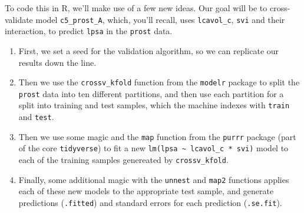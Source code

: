 \documentclass[]{book}
\newenvironment{Shaded}{\begin{snugshade}}{\end{snugshade}}
\newcommand{\KeywordTok}[1]{\textcolor[rgb]{0.13,0.29,0.53}{\textbf{#1}}}
\newcommand{\DataTypeTok}[1]{\textcolor[rgb]{0.13,0.29,0.53}{#1}}
\newcommand{\DecValTok}[1]{\textcolor[rgb]{0.00,0.00,0.81}{#1}}
\newcommand{\StringTok}[1]{\textcolor[rgb]{0.31,0.60,0.02}{#1}}
\newcommand{\OperatorTok}[1]{\textcolor[rgb]{0.81,0.36,0.00}{\textbf{#1}}}
\newcommand{\NormalTok}[1]{#1}
\providecommand{\tightlist}{%
  \setlength{\itemsep}{0pt}\setlength{\parskip}{0pt}}
\theoremstyle{definition}
\theoremstyle{definition}
\theoremstyle{definition}
\theoremstyle{remark}
\begin{document}
To code this in R, we'll make use of a few new ideas. Our goal will be
to cross-validate model \texttt{c5\_prost\_A}, which, you'll recall,
uses \texttt{lcavol\_c}, \texttt{svi} and their interaction, to predict
\texttt{lpsa} in the \texttt{prost} data.

\begin{enumerate}
\def\labelenumi{\arabic{enumi}.}
\tightlist
\item
  First, we set a seed for the validation algorithm, so we can replicate
  our results down the line.
\item
  Then we use the \texttt{crossv\_kfold} function from the
  \texttt{modelr} package to split the \texttt{prost} data into ten
  different partitions, and then use each partition for a split into
  training and test samples, which the machine indexes with
  \texttt{train} and \texttt{test}.
\item
  Then we use some magic and the \texttt{map} function from the
  \texttt{purrr} package (part of the core \texttt{tidyverse}) to fit a
  new \texttt{lm(lpsa\ \textasciitilde{}\ lcavol\_c\ *\ svi)} model to
  each of the training samples genereated by \texttt{crossv\_kfold}.
\item
  Finally, some additional magic with the \texttt{unnest} and
  \texttt{map2} functions applies each of these new models to the
  appropriate test sample, and generate predictions (\texttt{.fitted})
  and standard errors for each prediction (\texttt{.se.fit}).
\end{enumerate}

\begin{Shaded}
\end{Shaded}
\end{document}
